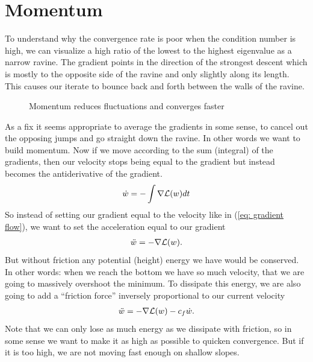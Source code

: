 
\chapter{Momentum}\label{chap: momentum}

To understand why the convergence rate is poor when the condition
number is high, we can visualize a high ratio of the lowest to the highest
eigenvalue as a narrow ravine. The gradient points in the direction of the
strongest descent which is mostly to the opposite side of the ravine and only slightly
along its length. This causes our iterate to bounce back and forth between
the walls of the ravine.
%
\begin{figure}[h]
	\centering
	\def\svgwidth{1\textwidth}
	
	\caption{Momentum reduces fluctuations and converges faster}
	\label{fig: visualize bad conditioning}
\end{figure}

As a fix it seems appropriate to average the gradients in some sense, to
cancel out the opposing jumps and go straight down the ravine. In other words
we want to build momentum. Now if we move according to the sum (integral) of
the gradients, then our velocity stops being equal to the gradient but instead
becomes the antiderivative of the gradient.
\begin{align*}
	\dot{w} = -\int\nabla\mathcal{L}(w)dt
\end{align*}
So instead of setting our gradient equal to the velocity like in (\ref{eq:
gradient flow}), we want to set the acceleration equal to our gradient
%
\begin{align*}
	\ddot{w} = -\nabla \mathcal{L}(w).
\end{align*}
%
But without friction any potential (height) energy we have would be conserved.
In other words: when we reach the bottom we have so much velocity, that we are
going to massively overshoot the minimum. To dissipate this energy, we are also
going to add a ``friction force'' inversely proportional to our current velocity
%
\begin{align}\label{eq: acceleration is gradient + friction}
	\ddot{w} = -\nabla \mathcal{L}(w) - c_f \dot{w}.
\end{align}
Note that we can only lose as much energy as we dissipate with friction, so in
some sense we want to make it as high as possible to quicken convergence. But
if it is too high, we are not moving fast enough on shallow slopes.

